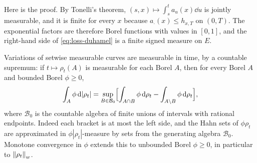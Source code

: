 Here is the proof. By Tonelli's theorem, $(s,x)\mapsto\int_s^ta_u(x)\dd u$
is jointly measurable, and it is finite for every $x$ because
$a_\cdot(x)\leq h_{x,T}$ on $(0,T)$. The exponential factors are therefore
Borel functions with values in $[0,1]$, and the right-hand side of
\eqref{eq:loss-duhamel} is a finite signed measure on $E$.

Variations of setwise measurable curves are measurable in time, by a
countable supremum: if $t\mapsto\rho_t(A)$ is measurable for each Borel
$A$, then for every Borel $A$ and bounded Borel $\phi\geq0$,
\begin{equation}
 \int_A\phi\,\mathrm d|\rho_t|
 =\sup_{B\in\mathcal B_0}\Bigl[\int_{A\cap B}\phi\,\mathrm d\rho_t
                          -\int_{A\setminus B}\phi\,\mathrm d\rho_t\Bigr],
 \label{eq:variation-countable-sup}
\end{equation}
where $\mathcal B_0$ is the countable algebra of finite unions of intervals
with rational endpoints. Indeed each bracket is at most the left side,
and the Hahn sets of $\phi\rho_t$ are approximated in
$\phi|\rho_t|$-measure by sets from the generating algebra $\mathcal B_0$.
Monotone convergence in $\phi$ extends this to unbounded Borel
$\phi\geq0$, in particular to $\left\lVert \rho_t\right\rVert_w$.

